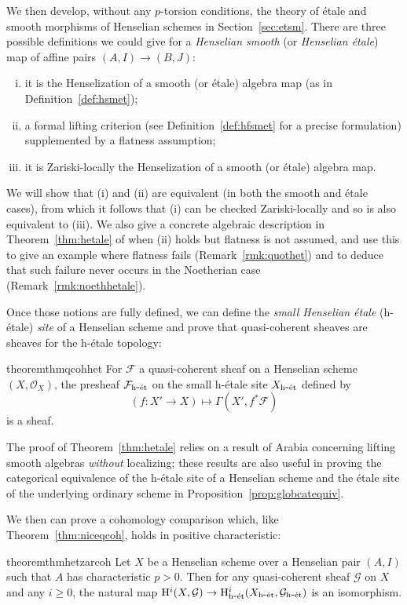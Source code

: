 \documentclass[12pt]{article}
\renewcommand{\O}{\mathscr{O}}
\newcommand{\F}{\mathcal{F}}
\newcommand{\G}{\mathcal{G}}
\newcommand{\Et}{\'etale\xspace}
\newcommand{\hetale}{h-\'etale\xspace}
\newcommand{\et}{{\rm\acute{e}t}}
\newcommand{\het}{{\rm h\mbox{-}\et}}
\renewcommand{\H}{{\rm H}}
\theoremstyle{definition}
\numberwithin{equation}{subsection}
\begin{document}
We then develop, without any $p$-torsion conditions, the theory of \Et and smooth morphisms of Henselian schemes in Section~\ref{sec:etsm}. There are three possible definitions we could give for a {\it Henselian smooth} (or {\it Henselian \Et}) map of affine pairs $(A,I) \to (B,J)$:
\begin{enumerate}[(i)]
\item it is the Henselization of a smooth (or \Et) algebra map (as in Definition~\ref{def:hsmet});
\item a formal lifting criterion (see Definition~\ref{def:hfsmet} for a precise formulation) supplemented by a flatness assumption;
\item it is Zariski-locally the Henselization of a smooth (or \Et) algebra map.
\end{enumerate}

We will show that (i) and (ii) are equivalent (in both the smooth and \Et cases), from which it follows that (i) can be checked Zariski-locally and so is also equivalent to (iii). We also give a concrete algebraic description in Theorem~\ref{thm:hetale} of when (ii) holds but flatness is not assumed, and use this to give an example where flatness fails (Remark~\ref{rmk:quothet}) and to deduce that such failure never occurs in the Noetherian case (Remark~\ref{rmk:noethhetale}). 

Once those notions are fully defined, we can define the {\it small Henselian \Et} (\hetale) {\it site} of a Henselian scheme and prove that quasi-coherent sheaves are sheaves for the \hetale topology:

\begin{restatable*}{theorem}{thmqcohhet}\label{thm:qcohhet} For $\F$ a quasi-coherent sheaf on a Henselian scheme $(X,\O_X)$, the presheaf $\F_{\het}$ on the small \hetale site $X_{\het}$ defined by $$(f: X' \to X) \mapsto \Gamma(X',f^*\F)$$ is a sheaf.
\end{restatable*}\vspace{.05in}


The proof of Theorem~\ref{thm:hetale} relies on a result of Arabia \cite{arabia} concerning lifting smooth algebras {\it without} localizing; these results are also useful in proving the categorical equivalence of the \hetale site of a Henselian scheme and the \Et site of the underlying ordinary scheme in Proposition~\ref{prop:globcatequiv}.


We then can prove a cohomology comparison which, like Theorem~\ref{thm:niceqcoh}, holds in positive characteristic:
\newcommand{\xhhet}{(X^h)_{\het}}
\newcommand{\xhet}{X_{\het}}
\newcommand{\fhhet}{(\F^h)_{\het}}
\newcommand{\xet}{X_{\et}}
\newcommand{\fet}{\F_{\et}}
\newcommand{\ghet}{\G_{\het}}
\newcommand{\hjet}{\H^j}
\newcommand{\hjhet}{\H^j}
\begin{restatable*}{theorem}{thmhetzarcoh}\label{thm:hetzarcoh} Let $X$ be a Henselian scheme over a Henselian pair $(A,I)$ such that $A$ has characteristic $p > 0$. Then for any quasi-coherent sheaf $\G$ on $X$ and any $i \ge 0$, the natural map $\H^i(X,\G) \to \H^i_{\het}(\xhet,\ghet)$ is an isomorphism.
\end{restatable*}
\end{document}
